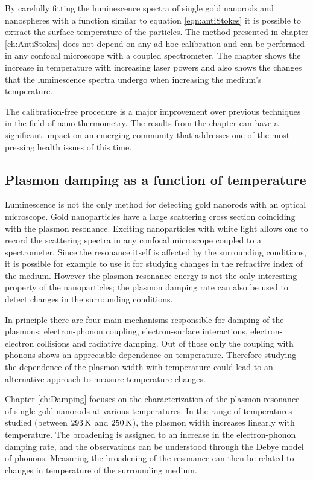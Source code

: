 By carefully fitting the luminescence spectra of single gold nanorods and
nanospheres with a function similar to equation \ref{eqn:antiStokes} it is
possible to extract the surface temperature of the particles. The method
presented in chapter \ref{ch:AntiStokes} does not depend on any ad-hoc
calibration and can be performed in any confocal microscope with a coupled
spectrometer. The chapter shows the increase in temperature with increasing
laser powers and also shows the changes that the luminescence spectra undergo
when increasing the medium's temperature.

The calibration-free procedure is a major improvement over previous techniques
in the field of nano-thermometry. The results from the chapter can have a
significant impact on an emerging community that addresses one of the most
pressing health issues of this time.

\subsection{Plasmon damping as a function of temperature}
Luminescence is not the only method for detecting gold nanorods with an optical
microscope. Gold nanoparticles have a large scattering cross section coinciding
with the plasmon resonance. Exciting nanoparticles with white light allows one
to record the scattering spectra in any confocal microscope coupled to a
spectrometer. Since the resonance itself is affected by the surrounding
conditions\cite{Liu2009b,Konrad2013}, it is possible for example to use it for
studying changes in the refractive index of the medium. However the plasmon
resonance energy is not the only interesting property of the nanoparticles; the
plasmon damping rate can also be used to detect changes in the surrounding
conditions.

\begin{sloppypar}
In principle there are four main mechanisms responsible for damping of the
plasmons\cite{Sonnichsen2002,Novo2006,Hu2008}: electron-phonon coupling,
electron-surface interactions, electron-electron collisions and radiative
damping. Out of those only the coupling with phonons shows an appreciable
dependence on temperature\cite{Liu2009b,Konrad2013}. Therefore studying the
dependence of the plasmon width with temperature could lead to an alternative
approach to measure temperature changes.
\end{sloppypar}

Chapter \ref{ch:Damping} focuses on the characterization of the plasmon
resonance of single gold nanorods at various temperatures. In the range of
temperatures studied (between $293\,\textrm{K}$ and $250\,\textrm{K}$), the plasmon width increases
linearly with temperature. The broadening is assigned to an increase in the
electron-phonon damping rate, and the observations can be understood through the
Debye model of phonons. Measuring the broadening of the resonance can then be
related to changes in temperature of the surrounding medium.

